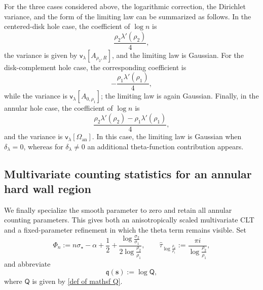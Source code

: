 \documentclass[a4paper]{article}
\numberwithin{equation}{section}
\begin{document}
For the three cases considered above, the logarithmic correction, the Dirichlet variance, and the form of the limiting law can be summarized as follows. In the centered-disk hole case, the coefficient of $\log n$ is
\[
\frac{\rho_2\lambda'(\rho_2)}{4},
\]
the variance is given by $\mathsf v_\lambda[A_{\rho_2,R}]$, and the limiting law is Gaussian. For the disk-complement hole case, the corresponding coefficient is
\[
-\frac{\rho_1\lambda'(\rho_1)}{4},
\]
while the variance is $\mathsf v_\lambda[A_{0,\rho_1}]$; the limiting law is again Gaussian. Finally, in the annular hole case, the coefficient of $\log n$ is
\[
\frac{\rho_2\lambda'(\rho_2)-\rho_1\lambda'(\rho_1)}{4},
\]
and the variance is $\mathsf v_\lambda[\Omega_{\mathrm{an}}]$. In this case, the limiting law is Gaussian when $\delta_\lambda=0$, whereas for $\delta_\lambda\neq0$ an additional theta-function contribution appears.


\subsection{Multivariate counting statistics for an annular hard wall region}
\label{subsection:annular-multivariate-counting}

We finally specialize the smooth parameter to zero and retain all annular
counting parameters.  This gives both an anisotropically scaled multivariate
CLT and a fixed-parameter refinement in which the theta term remains visible.
Set
\begin{equation}
\label{def:annular-counting-phase}
\Phi_n:=n\sigma_\star-\alpha+\frac12+\frac{\log\frac{\sigma_2}{\sigma_1}}{2\log\frac{\rho_2}{\rho_1}},
\qquad
\widehat \tau_{\log\frac{\rho_2}{\rho_1}}:=\frac{\pi i}{\log\frac{\rho_2}{\rho_1}},
\end{equation}
and abbreviate
\begin{equation}
\label{def:annular-q-sharp}
\mathfrak q(\boldsymbol s):=\log\mathsf Q,
\end{equation}
where $\mathsf Q$ is given by \eqref{def of mathsf Q}.
\end{document}
